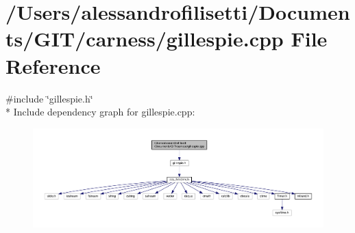 \hypertarget{a00065}{\section{/\+Users/alessandrofilisetti/\+Documents/\+G\+I\+T/carness/gillespie.cpp File Reference}
\label{a00065}
}
{\ttfamily \#include \char`\"{}gillespie.\+h\char`\"{}}\\*
Include dependency graph for gillespie.\+cpp\+:\nopagebreak
\begin{figure}[H]
\begin{center}
\leavevmode
\includegraphics[width=350pt]{a00185}
\end{center}
\end{figure}
